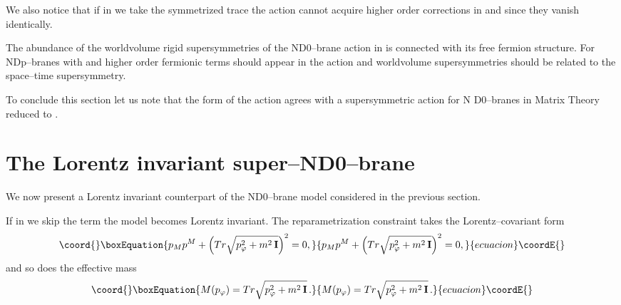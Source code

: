 \documentclass[a4paper,12pt]{article}
\begin{document}
We also notice that if in  we take the symmetrized trace the
action cannot acquire  higher order corrections in \myHighlight{$\psi$}\coordHE{} and
\myHighlight{$\dot\psi$}\coordHE{} since they vanish identically.

The abundance of the worldvolume rigid supersymmetries of the
ND0--brane action in \coordHE{} is connected with its free fermion
structure. For NDp--branes with \coordHE{} and \coordHE{} higher order
fermionic terms should appear in the action and worldvolume
supersymmetries should be related to the space--time
supersymmetry.

To conclude this section let us note that the form of the action
 agrees with a supersymmetric action for N D0--branes in Matrix
Theory \cite{Taylor:2000pr} reduced to \coordHE{}.

\section{The Lorentz invariant super--ND0--brane}

We now present a Lorentz invariant counterpart of the ND0--brane
model considered in the previous section.

If in  we skip the term \coordHE{} the model
becomes \coordHE{} Lorentz invariant. The reparametrization constraint
takes the Lorentz--covariant form
\begin{equation}\coord{}\boxEquation{\label{34}
p_Mp^M+\left(Tr\sqrt{p_\varphi^2+m^2\,{\bf I}}\right)^2=0,
}{p_Mp^M+\left(Tr\sqrt{p_\varphi^2+m^2\,{\bf I}}\right)^2=0,
}{ecuacion}\coordE{}\end{equation}
and so does the effective mass \coordHE{}
\begin{equation}\coord{}\boxEquation{\label{35}
M(p_\varphi)=Tr\sqrt{p_\varphi^2+m^2\,{\bf I}}\,.
}{M(p_\varphi)=Tr\sqrt{p_\varphi^2+m^2\,{\bf I}}\,.
}{ecuacion}\coordE{}\end{equation}
\end{document}
